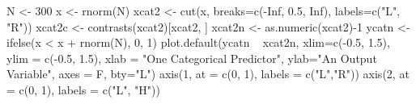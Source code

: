 \begin{Schunk}
\begin{Sinput}
 N <- 300
 x <- rnorm(N)
 xcat2 <- cut(x, breaks=c(-Inf, 0.5, Inf), labels=c("L", "R"))
 xcat2c <- contrasts(xcat2)[xcat2, ]	
 xcat2n <- as.numeric(xcat2)-1
 ycatn <- ifelse(x < x + rnorm(N), 0, 1)
 plot.default(ycatn ~ xcat2n, xlim=c(-0.5, 1.5), ylim = c(-0.5, 1.5), xlab = "One Categorical Predictor", ylab="An Output Variable", axes = F, bty="L")
 axis(1, at = c(0, 1), labels = c("L","R"))
 axis(2, at = c(0, 1), labels = c("L", "H"))
\end{Sinput}
\end{Schunk}
